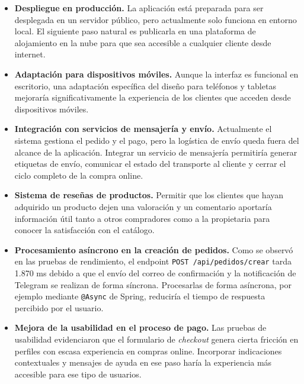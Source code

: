 \begin{itemize}
    \item \textbf{Despliegue en producción.} La aplicación está preparada para ser desplegada en un servidor público, pero actualmente solo funciona en entorno local. El siguiente paso natural es publicarla en una plataforma de alojamiento en la nube para que sea accesible a cualquier cliente desde internet.

    \item \textbf{Adaptación para dispositivos móviles.} Aunque la interfaz es funcional en escritorio, una adaptación específica del diseño para teléfonos y tabletas mejoraría significativamente la experiencia de los clientes que acceden desde dispositivos móviles.

    \item \textbf{Integración con servicios de mensajería y envío.} Actualmente el sistema gestiona el pedido y el pago, pero la logística de envío queda fuera del alcance de la aplicación. Integrar un servicio de mensajería permitiría generar etiquetas de envío, comunicar el estado del transporte al cliente y cerrar el ciclo completo de la compra online.

    \item \textbf{Sistema de reseñas de productos.} Permitir que los clientes que hayan adquirido un producto dejen una valoración y un comentario aportaría información útil tanto a otros compradores como a la propietaria para conocer la satisfacción con el catálogo.

    \item \textbf{Procesamiento asíncrono en la creación de pedidos.} Como se observó en las pruebas de rendimiento, el endpoint \texttt{POST /api/pedidos/crear} tarda 1.870 ms debido a que el envío del correo de confirmación y la notificación de Telegram se realizan de forma síncrona. Procesarlas de forma asíncrona, por ejemplo mediante \texttt{@Async} de Spring, reduciría el tiempo de respuesta percibido por el usuario.

    \item \textbf{Mejora de la usabilidad en el proceso de pago.} Las pruebas de usabilidad evidenciaron que el formulario de \textit{checkout} genera cierta fricción en perfiles con escasa experiencia en compras online. Incorporar indicaciones contextuales y mensajes de ayuda en ese paso haría la experiencia más accesible para ese tipo de usuarios.
\end{itemize}
